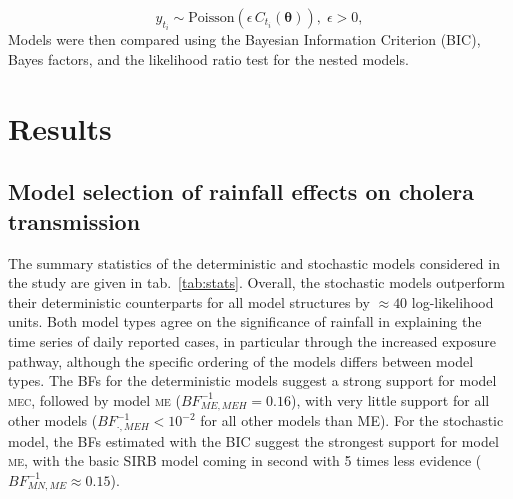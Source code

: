 \begin{equation}
 y_{t_i}  \sim \text{Poisson}\left(\epsilon \,C_{t_i}(\boldsymbol{\theta})\right), \; \epsilon > 0,
 \label{eq:obs}
\end{equation}
 Models were then compared using the Bayesian Information Criterion (BIC), Bayes factors, and the likelihood ratio test for the nested models.
 
 
\section{Results}

\subsection{Model selection of rainfall effects on cholera transmission}
The summary statistics of the deterministic and stochastic models considered in the study are given in tab.~\ref{tab:stats}. Overall, the stochastic models outperform their deterministic counterparts for all model structures by $\approx 40$ log-likelihood units. Both model types agree on the significance of rainfall in explaining the time series of daily reported cases, in particular through the increased exposure pathway, although the specific ordering of the models differs between model types. The BFs for the deterministic models suggest a strong support for model \textsc{mec}, followed by model \textsc{me} ($BF^{-1}_{ME,MEH} = 0.16$), with very little support for all other models ($BF^{-1}_{\boldsymbol{\cdot},MEH}< 10^{-2}$ for all other models than ME). For the stochastic model, the BFs estimated with the BIC suggest the strongest support for model \textsc{me}, with the basic SIRB model coming in second with 5 times less evidence ($BF^{-1}_{MN,ME} \approx 0.15$). 

